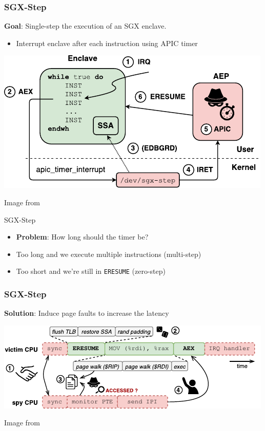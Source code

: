 \documentclass{beamer}
\begin{document}
\begin{frame}
    \frametitle{SGX-Step}

    \textbf{Goal}: Single-step the execution of an SGX enclave.

    \begin{itemize}
        \item Interrupt enclave after each instruction using APIC timer
    \end{itemize}
    
    \begin{center}
        \includegraphics{sgx-step-overview.pdf}
    \end{center}
    {\tiny\hfill\color{gray} Image from \cite{BulckPS17}}
\end{frame}

\begin{frame}{SGX-Step}
    \begin{itemize}
        \item \textbf{Problem}: How long should the timer be?
        \item Too long and we execute multiple instructions (multi-step)
        \item Too short and we're still in \texttt{ERESUME} (zero-step)
    \end{itemize}
\end{frame}

\begin{frame}
    \frametitle{SGX-Step}

    \textbf{Solution}: Induce page faults to increase the latency

    \begin{center}
        \includegraphics[scale=1.2]{sgx-step-pte.pdf}
    \end{center}

    {\tiny\hfill\color{gray} Image from \cite{ConstableBCXXAK23}}
\end{frame}
\end{document}
